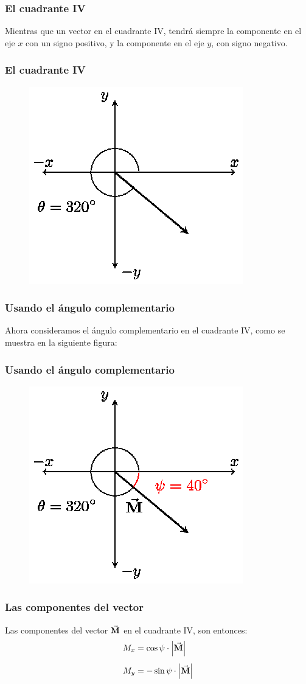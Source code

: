 \documentclass[14pt]{beamer}
\begin{document}
\begin{frame}
\frametitle{El cuadrante IV}
Mientras que un vector en el cuadrante IV, tendrá siempre la componente en el eje $x$ con un signo positivo, \pause y la componente en el eje $y$, con signo negativo.
\end{frame}
\begin{frame}
\frametitle{El cuadrante IV}
\begin{figure}
    \centering
    \includegraphics[scale=1.3]{Imagenes/Componentes_Vector_09.eps}
\end{figure}
\end{frame}
\begin{frame}
\frametitle{Usando el ángulo complementario}
Ahora consideramos el ángulo complementario en el cuadrante IV, como se muestra en la siguiente figura:
\end{frame}
\begin{frame}
\frametitle{Usando el ángulo complementario}
\begin{figure}
    \centering
    \includegraphics[scale=1.3]{Imagenes/Componentes_Vector_09a.eps}
\end{figure}
\end{frame}
\begin{frame}
\frametitle{Las componentes del vector}
Las componentes del vector $\va{M}$ en el cuadrante IV, son entonces:
\begin{align*}
M_{x} & = \cos \psi \cdot \abs{\va{M}} \\[0.5em]
M_{y} & = - \sin \psi \cdot \abs{\va{M}}
\end{align*}
\end{frame}
    
\end{document}

